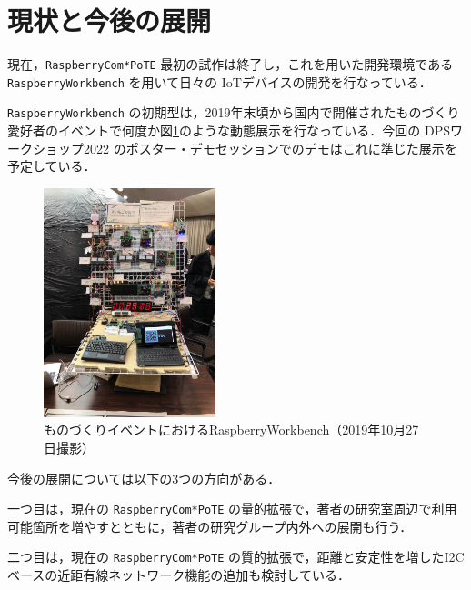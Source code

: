 
\section{現状と今後の展開}

\label{sec:07nextstep}

現在，{\tt Raspberry\-Com*PoTE} 最初の試作は終了し，これを用いた開発環境である {\tt Raspberry\-Workbench} を用いて日々の IoTデバイスの開発を行なっている．


{\tt Raspberry\-Workbench} の初期型は，2019年末頃から国内で開催されたものづくり愛好者のイベントで何度か図\ref{RaspberryWorkbench}のような動態展示を行なっている．今回の DPSワークショップ2022 のポスター・デモセッションでのデモはこれに準じた展示を予定している．

\begin{figure}[H]
\centering
\includegraphics[width=5cm]{figspics/RaspberryWorkbench2.jpg}
\caption{ものづくりイベントにおける{RaspberryWorkbench}（2019年10月27日撮影）}
\label{RaspberryWorkbench}
\end{figure}

今後の展開については以下の3つの方向がある．

一つ目は，現在の {\tt Raspberry\-Com*PoTE} の量的拡張で，著者の研究室周辺で利用可能箇所を増やすとともに，著者の研究グループ内外への展開も行う．


二つ目は，現在の {\tt Raspberry\-Com*PoTE} の質的拡張で，距離と安定性を増したI2Cベースの近距有線ネットワーク機能の追加も検討している．


